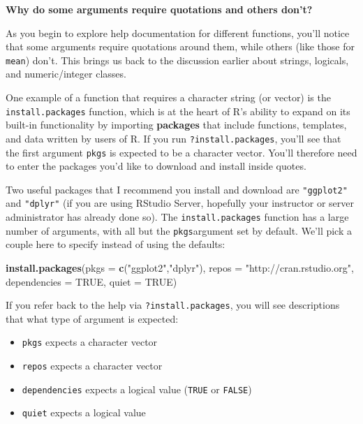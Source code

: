 \documentclass[]{tufte-book}
\newenvironment{Shaded}{\begin{snugshade}}{\end{snugshade}}
\newcommand{\AttributeTok}[1]{\textcolor[rgb]{0.13,0.29,0.53}{#1}}
\newcommand{\ConstantTok}[1]{\textcolor[rgb]{0.56,0.35,0.01}{#1}}
\newcommand{\FunctionTok}[1]{\textcolor[rgb]{0.13,0.29,0.53}{\textbf{#1}}}
\newcommand{\NormalTok}[1]{#1}
\newcommand{\StringTok}[1]{\textcolor[rgb]{0.31,0.60,0.02}{#1}}
\providecommand{\tightlist}{%
  \setlength{\itemsep}{0pt}\setlength{\parskip}{0pt}}
\begin{document}
\vspace*{0.2in}

\noindent\textbf{Why do some arguments require quotations and others don't?}\vspace*{0.1in}

As you begin to explore help documentation for different functions, you'll notice that some arguments require quotations around them, while others (like those for \texttt{mean}) don't. This brings us back to the discussion earlier about strings, logicals, and numeric/integer classes.

One example of a function that requires a character string (or vector) is the \texttt{install.packages} function, which is at the heart of R's ability to expand on its built-in functionality by importing \textbf{packages} that include functions, templates, and data written by users of R. If you run \texttt{?install.packages}, you'll see that the first argument \texttt{pkgs} is expected to be a character vector. You'll therefore need to enter the packages you'd like to download and install inside quotes.

Two useful packages that I recommend you install and download are \texttt{"ggplot2"} and \texttt{"dplyr"} (if you are using RStudio Server, hopefully your instructor or server administrator has already done so). The \texttt{install.packages} function has a large number of arguments, with all but the \texttt{pkgs}argument set by default. We'll pick a couple here to specify instead of using the defaults:

\begin{Shaded}
\begin{Highlighting}[]
\FunctionTok{install.packages}\NormalTok{(}\AttributeTok{pkgs =} \FunctionTok{c}\NormalTok{(}\StringTok{"ggplot2"}\NormalTok{,}\StringTok{"dplyr"}\NormalTok{),}
         \AttributeTok{repos =} \StringTok{"http://cran.rstudio.org"}\NormalTok{,}
         \AttributeTok{dependencies =} \ConstantTok{TRUE}\NormalTok{,}
         \AttributeTok{quiet =} \ConstantTok{TRUE}\NormalTok{)}
\end{Highlighting}
\end{Shaded}

If you refer back to the help via \texttt{?install.packages}, you will see descriptions that what type of argument is expected:

\begin{itemize}
\tightlist
\item
  \texttt{pkgs} expects a character vector
\item
  \texttt{repos} expects a character vector
\item
  \texttt{dependencies} expects a logical value (\texttt{TRUE} or \texttt{FALSE})
\item
  \texttt{quiet} expects a logical value
\end{itemize}
\end{document}
